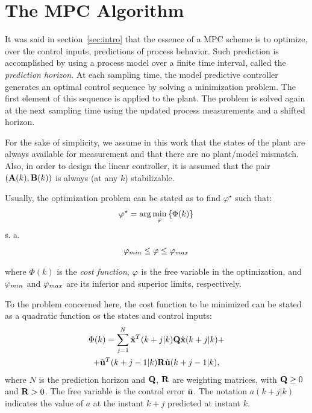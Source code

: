 \documentclass[conference]{IEEEtran} %
\begin{document}
\section{The MPC Algorithm}
\label{sec:mpc}

It was said in section~\ref{sec:intro} that the essence of a MPC scheme is
to optimize, over the control inputs, predictions of process behavior. Such
prediction is accomplished by using a process model over a finite time
interval, called the {\em prediction horizon}. At each sampling time, the
model predictive controller generates an optimal control sequence by solving
a minimization problem. The first element of this sequence is applied to the
plant. The problem is solved again at the next sampling time using the
updated process measurements and a shifted horizon.

For the sake of simplicity, we assume in this work that the states of the
plant are always available for measurement and that there are no
plant/model mismatch. Also, in order to design the linear controller, it is
assumed that the pair $({\bf A}(k),{\bf B}(k))$ is always (at any $k$)
stabilizable.

Usually, the optimization problem can be stated as to find $\varphi^\star$
such that:
\begin{equation*}
	\varphi^\star = \arg\min_{\bf\varphi}\left\{\Phi(k)\right\}
\end{equation*}
\noindent s. a.
\begin{equation*}\label{eqn:constr}
	{\bf\varphi}_{min} \leq {\bf\varphi} \leq {\bf\varphi}_{max}
\end{equation*}

\noindent where $\Phi(k)$ is the {\em cost function}, ${\bf\varphi}$ is the
free variable in the optimization, and ${\bf\varphi}_{min}$ and
${\bf\varphi}_{max}$ are its inferior and superior limits, respectively.

To the problem concerned here, the cost function to be minimized can be stated as a quadratic function os the states and control inputs:
\begin{multline}\label{eqn:cost}
	\Phi(k) = \sum_{j=1}^{N}\tilde{\bf x}^T(k+j|k){\bf Q}\tilde{\bf x}(k+j|k) + \\ + \tilde{\bf u}^T(k+j-1|k){\bf R}\tilde{\bf u}(k+j-1|k),
\end{multline}
\noindent where $N$ is the prediction horizon and ${\bf Q}$, ${\bf R}$ are
weighting matrices, with ${\bf Q}\geq 0$ and ${\bf R}>0$. The free variable
is the control error $\tilde{\bf u}$. The notation $a(k+j|k)$
indicates the value of $a$ at the instant $k+j$ predicted at instant $k$.
\end{document}
